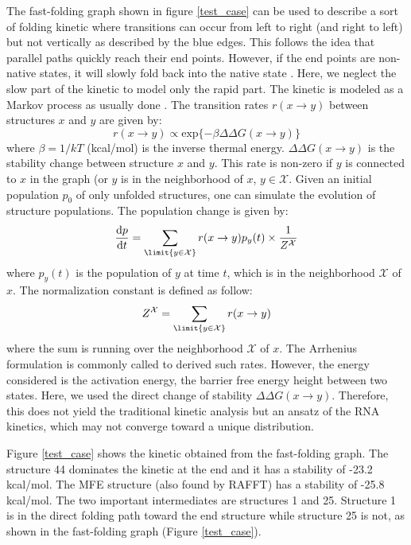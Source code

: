 \documentclass[a4paper,12pt]{article}
\begin{document}
The fast-folding graph shown in figure \ref{test_case} can be used to describe a
sort of folding kinetic where transitions can occur from left to right (and
right to left) but not vertically as described by the blue edges. This follows
the idea that parallel paths quickly reach their end points. However, if the end
points are non-native states, it will slowly fold back into the native state
\cite{pan97_foldin_rna_invol_paral_pathw}. Here, we neglect the slow part of the
kinetic to model only the rapid part. The kinetic is modeled as a Markov process
as usually done \cite{lorenz20_effic_comput_base_probab_multi_rna_foldin}. The
transition rates \(r(x\rightarrow y)\) between structures \(x\) and \(y\) are given by:
\begin{equation}
r(x\rightarrow y) \propto \text{exp}\{-\beta \Delta \Delta G(x\rightarrow y)\}
\end{equation}
where \(\beta=1/kT\) (kcal/mol) is the inverse thermal energy. \(\Delta \Delta
G(x\rightarrow y)\) is the stability change between structure \(x\) and \(y\). This
rate is non-zero if \(y\) is connected to \(x\) in the graph (or \(y\) is in the
neighborhood of \(x\), \(y \in \mathcal{X}\). Given an initial population \(p_{0}\) of
only unfolded structures, one can simulate the evolution of structure
populations. The population change is given by:
\begin{equation}
\frac{\text{d}p}{\text{d}t} = \sum_\limit{y \in \mathcal{X}} r(x\rightarrow y) p_{y}(t) \times \frac{1}{Z^\mathcal{X}}
\end{equation}
where \(p_{y}(t)\) is the population of \(y\) at time \(t\), which is in the
neighborhood \(\mathcal{X}\) of \(x\). The normalization constant is defined as
follow:
\begin{equation}
Z^\mathcal{X} = \sum_\limit{y \in \mathcal{X}} r(x \rightarrow y)
\end{equation}
where the sum is running over the neighborhood \(\mathcal{X}\) of \(x\). The
Arrhenius formulation is commonly called to derived such rates. However, the
energy considered is the activation energy, the barrier free energy height
between two states. Here, we used the direct change of stability \(\Delta \Delta
G (x \rightarrow y)\). Therefore, this does not yield the traditional kinetic
analysis but an ansatz of the RNA kinetics, which may not converge toward a
unique distribution.

Figure \ref{test_case} shows the kinetic obtained from the fast-folding graph. The
structure 44 dominates the kinetic at the end and it has a stability of -23.2
kcal/mol. The MFE structure (also found by RAFFT) has a stability of -25.8
kcal/mol. The two important intermediates are structures 1 and 25. Structure 1
is in the direct folding path toward the end structure while structure 25 is not,
as shown in the fast-folding graph (Figure \ref{test_case}).
\end{document}

